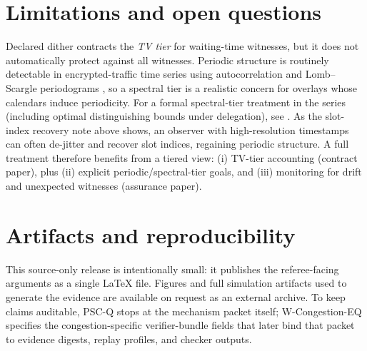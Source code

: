 \documentclass[11pt]{article}
\theoremstyle{definition}
\theoremstyle{remark}
\begin{document}
\section{Limitations and open questions}
Declared dither contracts the \emph{TV tier} for waiting-time witnesses, but it does not automatically protect against all witnesses.
Periodic structure is routinely detectable in encrypted-traffic time series using autocorrelation and Lomb--Scargle periodograms \cite{lomb1976,scargle1982,koumar2022periodic,assadhan2014,periodicity2025}, so a spectral tier is a realistic concern for overlays whose calendars induce periodicity. For a formal spectral-tier treatment in the series (including optimal distinguishing bounds under delegation), see \cite{series:spectral}.
As the slot-index recovery note above shows, an observer with high-resolution timestamps can often de-jitter and recover slot indices, regaining periodic structure.
A full treatment therefore benefits from a tiered view: (i) TV-tier accounting (contract paper), plus (ii) explicit periodic/spectral-tier goals, and (iii) monitoring for drift and unexpected witnesses (assurance paper).


\section{Artifacts and reproducibility}
This source-only release is intentionally small: it publishes the referee-facing arguments as a single \LaTeX{} file.
Figures and full simulation artifacts used to generate the evidence are available on request as an external archive.
To keep claims auditable, PSC-Q stops at the mechanism packet itself; W-Congestion-EQ specifies the congestion-specific verifier-bundle fields that later bind that packet to evidence digests, replay profiles, and checker outputs.
\end{document}
